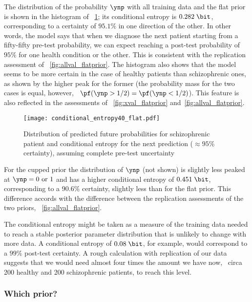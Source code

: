 The distribution of the probability $\ynp$ with all training data and the
flat prior is shown in the histogram of \fig~\ref{fig:cond_entropy}; its
conditional entropy is $0.282\;\bit$, corresponding to a certainty of
$95.1\%$ in one direction of the other. In other words, the model says that
when we diagnose the next patient starting from a fifty-fifty pre-test
probability, we can expect reaching a post-test probability of $95\%$ for
one health condition or the other. This is consistent with the replication
assessment of \fig~\ref{fig:allval_flatprior}. The histogram also shows
that the model seems to be more certain in the case of healthy patients
than schizophrenic ones, as shown by the higher peak for the former (the
probability mass for the two cases is equal, however, \ie\
$\pf(\ynp>1/2)= \pf(\ynp<1/2)$). This feature is also reflected in the
assessments of \figs~\ref{fig:xval_flatprior}
and~\ref{fig:allval_flatprior}.
\begin{figure}[!h]
  \centering
\texttt{[image: conditional\_entropy40\_flat.pdf]}%
\caption{Distribution of predicted future probabilities for schizophrenic
  patient and conditional entropy for the next prediction ($\approx 95\%$
  certainty), assuming complete pre-test uncertainty}
\label{fig:cond_entropy}
\end{figure}

For the cupped prior the distribution of $\ynp$ (not shown) is slightly
less peaked at $\ynp=0\text{ or }1$ and has a higher conditional entropy of
$0.451\;\bit$, corresponding to a $90.6\%$ certainty, slightly less
than for the flat prior. This difference accords with the difference
between the replication assessments of the two priors,
\fig~\ref{fig:allval_flatprior}.


The conditional entropy might be taken as a measure of the training data
needed to reach a stable posterior parameter distribution that is unlikely to
change with more data. A conditional entropy of $0.08\;\bit$, for example,
would correspond to a $99\%$ post-test certainty. A rough calculation with
replication of our data suggests that we would need almost four times the
amount we have now, \ie\ circa 200 healthy and 200 schizophrenic
patients, to reach this level.


\subsubsection{Which prior?}


